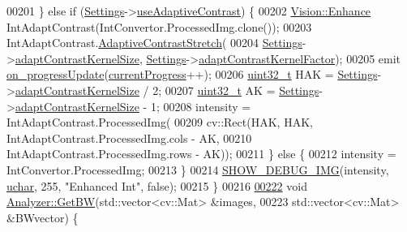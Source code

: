 \begin{DoxyCode}
00201   \} \textcolor{keywordflow}{else} \textcolor{keywordflow}{if} (\hyperlink{class_soil_analyzer_1_1_analyzer_a0a17b8f11ce60cd5b22d03b9925ee16e}{Settings}->\hyperlink{class_soil_analyzer_1_1_soil_settings_a0e27335d05aed8f3f084744062368578}{useAdaptiveContrast}) \{
00202     \hyperlink{class_vision_1_1_enhance}{Vision::Enhance} IntAdaptContrast(IntConvertor.ProcessedImg.clone());
00203     IntAdaptContrast.\hyperlink{class_vision_1_1_enhance_a7aa0dfb4808ffc7abddd7fe4e30f6601}{AdaptiveContrastStretch}(
00204         \hyperlink{class_soil_analyzer_1_1_analyzer_a0a17b8f11ce60cd5b22d03b9925ee16e}{Settings}->\hyperlink{class_soil_analyzer_1_1_soil_settings_a73f627b092dbdbda37b66ef6c2eef95c}{adaptContrastKernelSize}, 
      \hyperlink{class_soil_analyzer_1_1_analyzer_a0a17b8f11ce60cd5b22d03b9925ee16e}{Settings}->\hyperlink{class_soil_analyzer_1_1_soil_settings_ace12c0f4bc35d420ef528cc390fc2cdb}{adaptContrastKernelFactor});
00205     emit \hyperlink{class_soil_analyzer_1_1_analyzer_a808a8c21029471c4af0be996cb67d14c}{on\_progressUpdate}(\hyperlink{class_soil_analyzer_1_1_analyzer_a068a9d419064799836bb8caff60a2141}{currentProgress}++);
00206     \hyperlink{_soil_math_types_8h_a435d1572bf3f880d55459d9805097f62}{uint32\_t} HAK = \hyperlink{class_soil_analyzer_1_1_analyzer_a0a17b8f11ce60cd5b22d03b9925ee16e}{Settings}->\hyperlink{class_soil_analyzer_1_1_soil_settings_a73f627b092dbdbda37b66ef6c2eef95c}{adaptContrastKernelSize} / 2;
00207     \hyperlink{_soil_math_types_8h_a435d1572bf3f880d55459d9805097f62}{uint32\_t} AK = \hyperlink{class_soil_analyzer_1_1_analyzer_a0a17b8f11ce60cd5b22d03b9925ee16e}{Settings}->\hyperlink{class_soil_analyzer_1_1_soil_settings_a73f627b092dbdbda37b66ef6c2eef95c}{adaptContrastKernelSize} - 1;
00208     intensity = IntAdaptContrast.ProcessedImg(
00209         cv::Rect(HAK, HAK, IntAdaptContrast.ProcessedImg.cols - AK,
00210                  IntAdaptContrast.ProcessedImg.rows - AK));
00211   \} \textcolor{keywordflow}{else} \{
00212     intensity = IntConvertor.ProcessedImg;
00213   \}
00214   \hyperlink{_vision_debug_8h_aae864fa4f990213a4184a209ff236202}{SHOW\_DEBUG\_IMG}(intensity, \hyperlink{_soil_math_types_8h_a65f85814a8290f9797005d3b28e7e5fc}{uchar}, 255, \textcolor{stringliteral}{"Enhanced Int"}, \textcolor{keyword}{false});
00215 \}
00216 
\hypertarget{analyzer_8cpp_source_l00222}{}\hyperlink{class_soil_analyzer_1_1_analyzer_a13975656889dddd31bb9cff565fd3c9f}{00222} \textcolor{keywordtype}{void} \hyperlink{class_soil_analyzer_1_1_analyzer_a13975656889dddd31bb9cff565fd3c9f}{Analyzer::GetBW}(std::vector<cv::Mat> &images,
00223                      std::vector<cv::Mat> &BWvector) \{

\end{DoxyCode}
